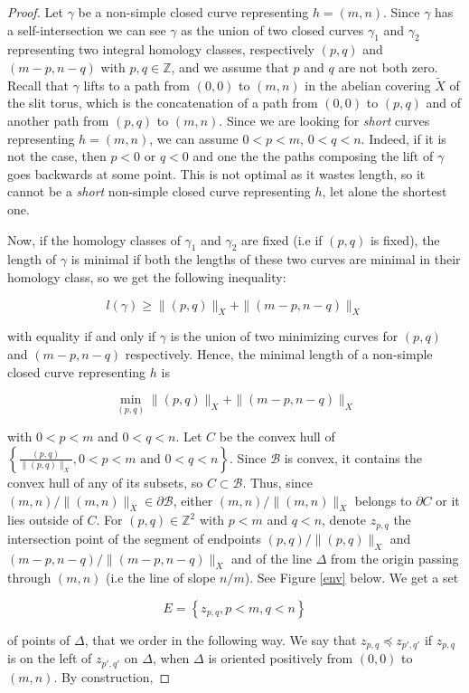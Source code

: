 \documentclass{article}
\newcommand{\ZZ}{\mathbb{Z}}
\newcommand{\Bb}{\mathcal{B}}
\newcommand{\St}[1]{\|#1\|_X}
\theoremstyle{definition}
\begin{document}
\begin{proof}
	
	Let $\gamma$ be a non-simple closed curve representing $h=(m,n)$. Since $\gamma$ has a self-intersection we can see $\gamma$ as the union of two closed curves $\gamma_1$ and $\gamma_2$ representing two integral homology classes, respectively $(p,q)$ and $(m-p, n-q)$ with $p,q\in \ZZ$, and we assume that $p$ and $q$ are not both zero.  Recall that $\gamma$ lifts to a path from $(0,0)$ to $(m,n)$ in the abelian covering $\tilde{X}$ of the slit torus, which is the concatenation of a path from $(0,0)$ to $(p,q)$ and of another path from $(p,q)$ to $(m,n)$. Since we are looking for \emph{short} curves representing $h=(m,n)$, we can assume $0<p<m$, $0<q<n$. Indeed, if it is not the case, then $p <0$ or $q<0$ and one the the paths composing the lift of $\gamma$ goes backwards at some point. This is not optimal as it wastes length, so it cannot be a \emph{short} non-simple closed curve representing $h$, let alone the shortest one.
	
	Now, if the homology classes of $\gamma_1$ and $\gamma_2$ are fixed (i.e if $(p,q)$ is fixed), the length of $\gamma$ is minimal if both the lengths of these two curves are minimal in their homology class, so we get the following inequality:
	
	$$l(\gamma) \ge \St{(p,q)}+\St{(m-p,n-q)} $$
	
	with equality if and only if $\gamma$ is the union of two minimizing curves for $(p,q)$ and $(m-p,n-q)$ respectively. Hence, the minimal length of a non-simple closed curve representing $h$ is
	
	$$ \min\limits_{(p,q)} \St{(p,q)}+\St{(m-p,n-q)} $$
	
	with $0<p<m$ and $0<q<n$. Let $C$ be the convex hull of $\left \{ \frac{(p,q)}{\St{(p,q)}}, 0<p<m \text{ and } 0<q<n \right \}$. Since $\Bb$ is convex, it contains the convex hull of any of its subsets, so $C\subset \Bb$. Thus, since $(m,n)/\St{(m,n)} \in \partial\Bb$, either $(m,n)/\St{(m,n)}$ belongs to $\partial C$ or it lies outside of $C$. For $(p,q)\in\ZZ^2$ with $p<m$ and $q<n$, denote $z_{p,q}$ the intersection point of the segment of endpoints  $(p,q)/ \St{(p,q)}$ and $(m-p,n-q)/ \St{(m-p,n-q)}$ and of the line $\Delta$ from the origin passing through $(m,n)$ (i.e the line of slope $n/m$). See Figure \ref{env} below. We get a set 
	
	$$E = \left \{ z_{p,q}, p<m, q<n \right \}$$
	
	of points of $\Delta$, that we order in the following way. We say that $z_{p,q} \preceq z_{p',q'}$ if $z_{p,q}$ is on the left of $z_{p',q'}$ on $\Delta$, when $\Delta$ is oriented positively from $(0,0)$ to $(m,n)$. By construction, 
	

\end{proof}
\end{document}
